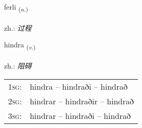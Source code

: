 \documentclass[frontgrid, backgrid]{flacards}\usepackage[]{graphicx}\usepackage[]{xcolor}
\begin{document}
\renewcommand{\flhead}{\vskip5pt \fboxsep=0pt {\small\bfseries\footnotesize Nafnorð | 名词}}
\renewcommand{\fcfoot}{\vskip5pt \fboxsep=0pt \hspace{2pt}{\small\bfseries\footnotesize 3K}}

\renewcommand{\blhead}{\vskip5pt {\small\bfseries\footnotesize Nafnorð | 名词 }}
\renewcommand{\bcfoot}{\vskip5pt \hspace{2pt}{\small\bfseries\footnotesize 3K}}


{ferli \small{\textsubscript{(\textit{n.})}} \\[1ex] %
\textphonetic{[fɛrtlɪ]} \\
zh.: \emph{过程} \\  [2ex]
\renewcommand*{\arraystretch}{0.8}
}

\renewcommand{\flhead}{\vskip5pt \fboxsep=0pt {\small\bfseries\footnotesize Sagnorð | 动词}}
\renewcommand{\fcfoot}{\vskip5pt \fboxsep=0pt \hspace{2pt}{\small\bfseries\footnotesize 3K}}

\renewcommand{\blhead}{\vskip5pt {\small\bfseries\footnotesize Sagnorð | 动词 }}
\renewcommand{\bcfoot}{\vskip5pt \hspace{2pt}{\small\bfseries\footnotesize 3K}}


{hindra \small{\textsubscript{(\textit{v.})}} \\[1ex] %
\textphonetic{[hɪntra]} \\
zh.: \emph{阻碍} \\  [2ex]
\renewcommand*{\arraystretch}{0.8}
\begin{tabular}{p{1cm}l}
\textsc{1sg}: & hindra -- hindraði -- hindrað \\ 
\textsc{2sg}: & hindrar -- hindraðir -- hindrað \\ 
\textsc{3sg}: & hindrar -- hindraði -- hindrað \\ 
\end{tabular}
}
\end{document}
